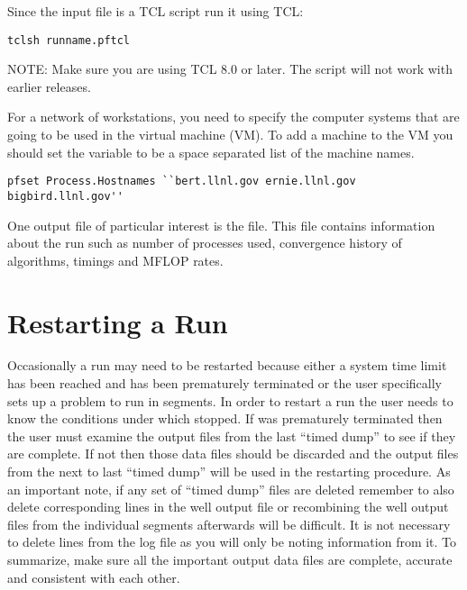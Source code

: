 Since the input file is a TCL script run it using TCL:

\begin{display}\begin{verbatim}
tclsh runname.pftcl
\end{verbatim}\end{display}

NOTE: Make sure you are using TCL 8.0 or later.  The script will not
work with earlier releases.

For a network of workstations, you need to specify the computer
systems that are going to be used in the virtual machine (VM).  To add
a machine to the VM you should set the 
variable to be a space separated list of the machine names.

\begin{display}\begin{verbatim}
pfset Process.Hostnames ``bert.llnl.gov ernie.llnl.gov bigbird.llnl.gov''
\end{verbatim}\end{display}

One output file of particular interest is the  file.  This file contains information about the run
such as number of processes used, convergence history of algorithms,
timings and MFLOP rates.

\section{Restarting a Run}
\label{Restarting a Run}

Occasionally a \parflow{} run may need to be restarted because either a
system time limit has been reached and \parflow{} has been prematurely
terminated or the user specifically sets up a problem to run in segments.
In order to restart a run the user needs to know the conditions under which
\parflow{} stopped.  If \parflow{} was prematurely terminated then the
user must examine the output files from the last ``timed dump'' to see if
they are complete.  If not then those data files should be discarded and the
output files from the next to last ``timed dump'' will be used in the
restarting procedure.  As an important note, if any set of ``timed dump''
files are deleted remember to also delete corresponding lines in the well
output file or recombining the well output files from the individual segments
afterwards will be difficult.  It is not necessary to delete lines from
the log file as you will only be noting information from it.  To summarize,
make sure all the important output data files are complete, accurate and
consistent with each other.

